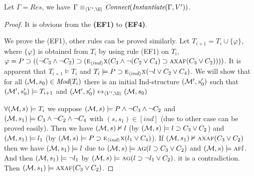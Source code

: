 \documentclass{article}
\begin{document}
\begin{proposition} \label{pro:EF}
Let $\Gamma=Res$, we have $\Gamma \equiv_{\tuple{V', {\O}}}\emph{Connect}(\emph{Instantiate}(\Gamma, V'))$.
\end{proposition}
\begin{proof}
It is obvious from the  \textbf{(EF1)} to \textbf{(EF4)}.

We prove the (EF1), other rules can be proved similarly.
Let $T_{i+1}=T_i \cup \{\varphi\}$, where $\{\varphi\}$ is obtained from $T_i$ by using rule (EF1) on $T_i$, \ie $\varphi =P \supset ((\neg C_3 \wedge \neg C_2) \supset  (\textsc{e}_{{\langle{ind}\rangle}}\textsc{x}(C_3 \wedge \neg (C_2 \vee C_4) \supset \textsc{a}\textsc{x} \textsc{a}\textsc{f}(C_3 \vee C_2))))$.
It is apparent that $T_{i+1} \models T_i$ and $T_i \models P\supset \textsc{e}_{{\langle{ind}\rangle}}\textsc{x} (\neg l \vee C_2 \vee C_4)$.
We will show that for all $({\cal M}, s_0) \in \textit{Mod}(T_i)$ there is an initial Ind-structure $({\cal M}',s_0')$ such that $({\cal M}',s_0') \models T_{i+1}$ and $(\Hm',s_0') \lrto_{\tuple{V', {\O}}} (\Hm, s_0)$

$\forall ({\cal M}, s) \models T_i$ we suppose $({\cal M}, s) \models P \wedge \neg C_3 \wedge \neg C_2$ and $({\cal M}, s_1)\models C_3 \wedge \neg C_2 \wedge \neg C_4$ with $(s, s_1) \in [ind]$ (due to other case can be proved easily).
Then we have $({\cal M}, s) \nvDash l$ (by $({\cal M}, s) \models l \supset C_3 \vee C_2$) and $({\cal M},s_1) \models l_1$ (by $({\cal M}, s) \models P\supset \textsc{e}_{{\langle{ind}\rangle}}\textsc{x} (l_1 \vee C_4)$).
If $({\cal M},s_1) \nvDash \textsc{a}\textsc{x} \textsc{a}\textsc{f}(C_3 \vee C_2)$ then we have $({\cal M}, s_1) \models l$ due to $({\cal M}, s) \models \textsc{a}\textsc{g}(l\supset C_3 \vee C_2)$ and $({\cal M}, s)\models \textsc{a}\textsc{f} l$.
And then $({\cal M}, s_1) \models \neg l_1$ by $({\cal M},s) \models \textsc{a} \textsc{g}(l\supset \neg l_1 \vee C_2)$.
it is a contradiction.
Then $({\cal M},s_1) \models \textsc{a}\textsc{x} \textsc{a}\textsc{f}(C_3 \vee C_2)$.


\end{proof}
\end{document}
